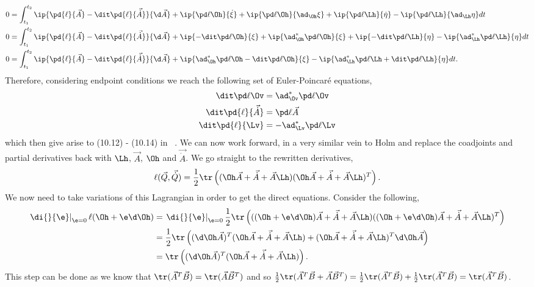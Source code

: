 \begin{align*}
  0 &= \int_{t_1}^{t_2} \ip{\pd{\ell}{\vec A} - \dit\pd{\ell}{\vec{\dot A}}}{\d \vec A} + \ip{\pd \ell \Oh}{\dot \xi} + \ip{\pd \ell \Oh}{\ad_{\Oh} \xi} + \ip{\pd \ell \Lh}{\dot \eta} - \ip{\pd \ell \Lh}{\ad_{\Lh} \eta}dt \\
  0 &= \int_{t_1}^{t_2} \ip{\pd{\ell}{\vec A} - \dit\pd{\ell}{\vec{\dot A}}}{\d \vec A} + \ip{-\dit\pd \ell \Oh}{\xi} + \ip{\ad^*_{\Oh} \pd \ell \Oh}{\xi} + \ip{-\dit \pd \ell \Lh}{\eta} - \ip{\ad^*_{\Lh} \pd \ell \Lh}{ \eta}dt \\
  0 &= \int_{t_1}^{t_2} \ip{\pd{\ell}{\vec A} - \dit\pd{\ell}{\vec{\dot A}}}{\d \vec A} + \ip{\ad^*_{\Oh} \pd \ell \Oh -\dit\pd \ell \Oh}{\xi} - \ip{\ad^*_{\Lh} \pd \ell \Lh + \dit \pd \ell \Lh}{ \eta}dt.
\end{align*}
Therefore, considering endpoint conditions we reach the following set of Euler-Poincar\'e equations,
\begin{align}
  \dit \pd \ell \Ov &= \ad^*_{\Ov} \pd \ell \Ov \\
  \dit \pd{\ell}{\vec{\dot A}} &= \pd \ell {\vec A} \\
  \dit \pd{\ell}{\Lv} &= -\ad^*_{\Lv} \pd \ell \Lv
\end{align}
which then give arise to (10.12) - (10.14) in ~\cite{holm_schmah_stoica_2009}. We can now work forward, in a very similar vein to Holm and replace the coadjoints and partial derivatives back with $\Lh$, $\vec A$, $\Oh$ and $\vec{\dot A}$. We go straight to the rewritten derivatives,
$$ \ell(\vec Q, \vec{\dot Q}) = \frac{1}{2}\tr \left( (\Oh \vec A + \vec {\dot A} + \vec A\Lh)(\Oh \vec A + \vec {\dot A} + \vec A\Lh)^T \right). $$
We now need to take variations of this Lagrangian in order to get the direct equations. Consider the following,
\begin{align*}
  \left.\di{}{\e}\right|_{\e = 0}\ell (\Oh + \e\d\Oh) &= \left.\di{}{\e}\right|_{\e = 0} \frac{1}{2}\tr\left( ((\Oh + \e\d\Oh) \vec A + \vec {\dot A} + \vec A\Lh)((\Oh + \e\d\Oh) \vec A + \vec {\dot A} + \vec A\Lh)^T \right) \\
  &= \frac{1}{2}\tr\left( (\d\Oh \vec A)^T (\Oh \vec A + \vec {\dot A} + \vec A\Lh) + (\Oh \vec A + \vec {\dot A} + \vec A\Lh)^T \d\Oh \vec A \right)\\
  &= \tr\left( (\d\Oh \vec A)^T (\Oh \vec A + \vec {\dot A} + \vec A\Lh)  \right).
\end{align*}
This step can be done as we know that $\tr(\vec A^T\vec B) = \tr(\vec A\vec B^T)$ and so $\frac{1}{2}\tr(\vec A^T\vec B + \vec A\vec B^T) = \frac{1}{2}\tr(\vec A^T\vec B) + \frac{1}{2}\tr(\vec A^T\vec B) = \tr(\vec A^T\vec B)$.

